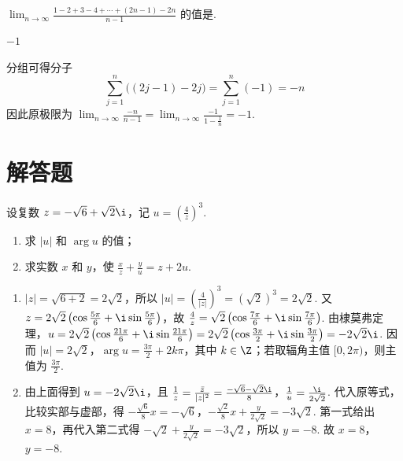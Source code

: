 \begin{problem}
\(\displaystyle\lim_{n \to \infty}\frac{1 - 2 + 3 - 4 + \cdots + (2n - 1) - 2n}{n - 1}\) 的值是\fillinblank{}.
\end{problem}

\begin{answer}
\(-1\)
\end{answer}

\begin{solution}
分组可得分子
\[
\sum_{j=1}^{n}\bigl((2j-1)-2j\bigr)=\sum_{j=1}^{n}(-1)=-n
\]
因此原极限为 \(\displaystyle\lim_{n\to\infty}\frac{-n}{n-1}=\lim_{n\to\infty}\frac{-1}{1-\frac{1}{n}}=-1\).
\end{solution}

\section{解答题}

\begin{problem}
设复数 \(z = -\sqrt{6} + \sqrt{2}\i\)，记 \(u = \left(\frac{4}{z}\right)^3\).
\begin{enumerate}
\item 求 \(|u|\) 和 \(\arg u\) 的值；
\item 求实数 \(x\) 和 \(y\)，使 \(\frac{x}{z} + \frac{y}{u} = z + 2u\).
\end{enumerate}
\end{problem}

\begin{solution}
\begin{enumerate}
\item \(|z|=\sqrt{6+2}=2\sqrt2\)，所以 \(|u|=\left(\frac4{|z|}\right)^3=\left(\sqrt2\right)^3=2\sqrt2\). 又 \(z=2\sqrt2\left(\cos\frac{5\pi}{6}+\i\sin\frac{5\pi}{6}\right)\)，故 \(\frac4z=\sqrt2\left(\cos\frac{7\pi}{6}+\i\sin\frac{7\pi}{6}\right)\). 由棣莫弗定理，\(u=2\sqrt2\left(\cos\frac{21\pi}{6}+\i\sin\frac{21\pi}{6}\right)=2\sqrt2\left(\cos\frac{3\pi}{2}+\i\sin\frac{3\pi}{2}\right)=-2\sqrt2\i\). 因而 \(|u|=2\sqrt2\)，\(\arg u=\frac{3\pi}{2}+2k\pi\)，其中 \(k\in\Z\)；若取辐角主值 \([0,2\pi)\)，则主值为 \(\frac{3\pi}{2}\).
\item 由上面得到 \(u=-2\sqrt2\i\)，且 \(\frac1z=\frac{\bar z}{|z|^2}=\frac{-\sqrt6-\sqrt2\i}{8}\)，\(\frac1u=\frac{\i}{2\sqrt2}\). 代入原等式，比较实部与虚部，得
\(-\frac{\sqrt6}{8}x=-\sqrt6\)，\(-\frac{\sqrt2}{8}x+\frac{y}{2\sqrt2}=-3\sqrt2\).
第一式给出 \(x=8\)，再代入第二式得 \(-\sqrt2+\frac{y}{2\sqrt2}=-3\sqrt2\)，所以 \(y=-8\). 故 \(x=8\)，\(y=-8\).
\end{enumerate}
\end{solution}

